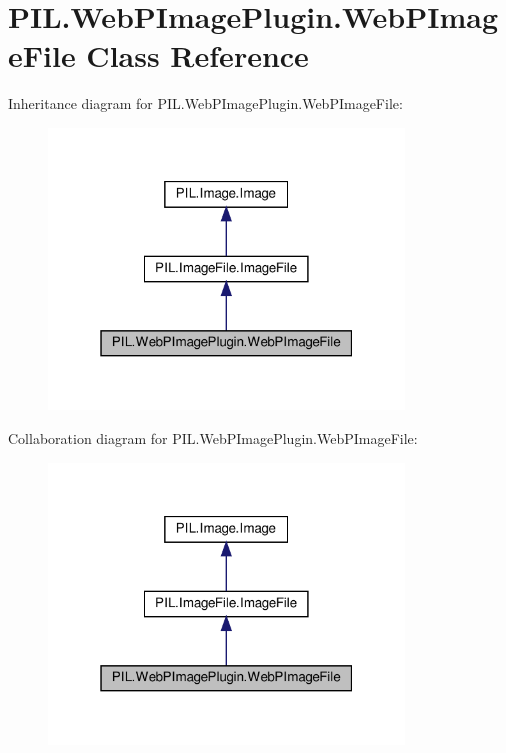 \hypertarget{classPIL_1_1WebPImagePlugin_1_1WebPImageFile}{}\section{P\+I\+L.\+Web\+P\+Image\+Plugin.\+Web\+P\+Image\+File Class Reference}
\label{classPIL_1_1WebPImagePlugin_1_1WebPImageFile}


Inheritance diagram for P\+I\+L.\+Web\+P\+Image\+Plugin.\+Web\+P\+Image\+File\+:
\nopagebreak
\begin{figure}[H]
\begin{center}
\leavevmode
\includegraphics[width=268pt]{classPIL_1_1WebPImagePlugin_1_1WebPImageFile__inherit__graph}
\end{center}
\end{figure}


Collaboration diagram for P\+I\+L.\+Web\+P\+Image\+Plugin.\+Web\+P\+Image\+File\+:
\nopagebreak
\begin{figure}[H]
\begin{center}
\leavevmode
\includegraphics[width=268pt]{classPIL_1_1WebPImagePlugin_1_1WebPImageFile__coll__graph}
\end{center}
\end{figure}
